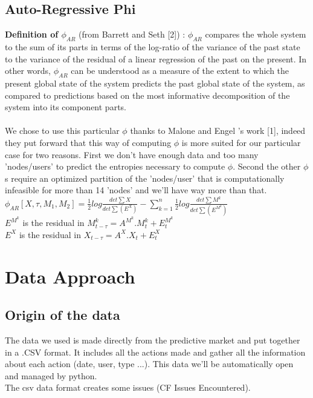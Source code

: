 \documentclass{report}
\begin{document}
\section{Auto-Regressive Phi}

\textbf{Definition of $ \phi_{AR} $} (from Barrett and Seth [2]) : $ \phi_{AR} $ compares the whole system to the sum of its parts in	terms of the log-ratio of the variance of the past state to the variance of the residual of a linear regression of the past on the present. In other words, $ \phi_{AR} $ can be understood as a measure of the extent to which the present global state of the system predicts the past global state of the system, as compared to predictions based on the most informative decomposition of the system into its component parts.\\
\\

We chose to use this particular $\phi $ thanks to Malone and Engel 's work [1], indeed they put forward that this way of computing $\phi $ is more suited for our particular case for two reasons. First we don't have enough data and too many 'nodes/users' to predict the entropies necessary to compute $\phi $. Second the other $\phi $s require an optimized partition of the 'nodes/user' that is computationally infeasible for more than 14 'nodes' and we'll have way more than that. \\


$ \phi_{AR} [X, \tau, {M_1 , M_2}] = \frac{1}{2} log\frac{det\sum X}{det\sum (E^X)} - \sum_{k=1}^{n} \frac{1}{2} log \frac{det\sum M^k}{det\sum (E^{M^k})} $ \\

$ E^{M^k}$ is the residual in $ M_{t-\tau}^k = A^{M^k} . M_t^k + E_t^{M^k} $ \\
	
$ E^{X}$ is the residual in $ X_{t-\tau} = A^{X} . X_t + E_t^X $ \\

\chapter{Data Approach}
\section{Origin of the data}

The data we used is made directly from the predictive market and put together in a .CSV format. It includes all the actions made and gather all the information about each action (date, user, type ...). This data we'll be automatically open and managed by python.\\
The csv data format creates some issues (CF Issues Encountered).
\end{document}
